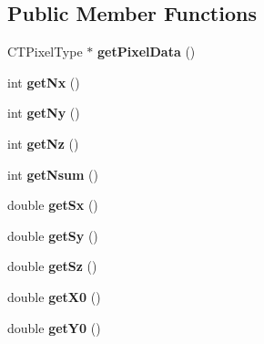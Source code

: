 \subsection*{Public Member Functions}
\begin{DoxyCompactItemize}
\item 
\hypertarget{class_c_t_image_a7529d1815be93ca599e1e69d0d43de72}{
CTPixelType $\ast$ {\bfseries getPixelData} ()}
\label{class_c_t_image_a7529d1815be93ca599e1e69d0d43de72}

\item 
\hypertarget{class_c_t_image_a705dcd66ad91dcb6261d0440ac57f9fb}{
int {\bfseries getNx} ()}
\label{class_c_t_image_a705dcd66ad91dcb6261d0440ac57f9fb}

\item 
\hypertarget{class_c_t_image_ab65ce01a52ebee47b5fa4e52b0d0490f}{
int {\bfseries getNy} ()}
\label{class_c_t_image_ab65ce01a52ebee47b5fa4e52b0d0490f}

\item 
\hypertarget{class_c_t_image_a6ddad3d09ae365d73c6886fbbf537d02}{
int {\bfseries getNz} ()}
\label{class_c_t_image_a6ddad3d09ae365d73c6886fbbf537d02}

\item 
\hypertarget{class_c_t_image_ada51c93e1c9caa3f59a58bb0f504f85b}{
int {\bfseries getNsum} ()}
\label{class_c_t_image_ada51c93e1c9caa3f59a58bb0f504f85b}

\item 
\hypertarget{class_c_t_image_a05ae30369fdb56f51a3640d1e9eec380}{
double {\bfseries getSx} ()}
\label{class_c_t_image_a05ae30369fdb56f51a3640d1e9eec380}

\item 
\hypertarget{class_c_t_image_ab90280136f50cf3aa48dcef9535ec966}{
double {\bfseries getSy} ()}
\label{class_c_t_image_ab90280136f50cf3aa48dcef9535ec966}

\item 
\hypertarget{class_c_t_image_a708249b5307e97cd423625ced235c70e}{
double {\bfseries getSz} ()}
\label{class_c_t_image_a708249b5307e97cd423625ced235c70e}

\item 
\hypertarget{class_c_t_image_a12e90bcd694a9dfeef6ad24e4c37f964}{
double {\bfseries getX0} ()}
\label{class_c_t_image_a12e90bcd694a9dfeef6ad24e4c37f964}

\item 
\hypertarget{class_c_t_image_aeba18c34c2108f511a1ef452a1546881}{
double {\bfseries getY0} ()}
\label{class_c_t_image_aeba18c34c2108f511a1ef452a1546881}


\end{DoxyCompactItemize}
